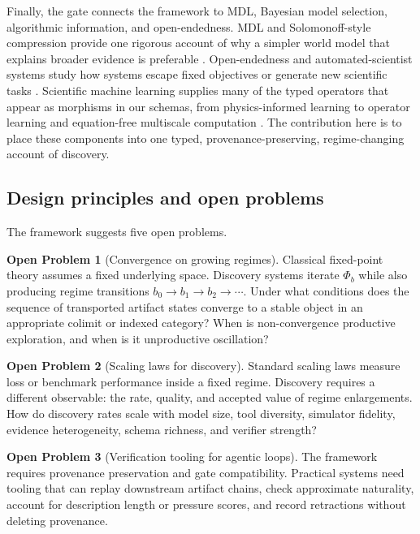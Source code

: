 \documentclass[11pt]{article}
\theoremstyle{definition}
\newtheorem*{openproblem}{Open Problem}
\begin{document}
Finally, the gate connects the framework to MDL, Bayesian model selection, algorithmic information, and open-endedness. MDL and Solomonoff-style compression provide one rigorous account of why a simpler world model that explains broader evidence is preferable \citep{rissanen_mdl_1978,gruenwald_mdl_2007,solomonoff_1964,hutter_aixi_2005,schwarz_bic_1978}. Open-endedness and automated-scientist systems study how systems escape fixed objectives or generate new scientific tasks \citep{stanley_open_endedness_2017,wang_poet_2019,lu_ai_scientist_2024,lu_ai_scientist_v2_2025}. Scientific machine learning supplies many of the typed operators that appear as morphisms in our schemas, from physics-informed learning to operator learning and equation-free multiscale computation \citep{karniadakis_pinns_2021,lu_deeponet_2021,kevrekidis_equation_free_2003}. The contribution here is to place these components into one typed, provenance-preserving, regime-changing account of discovery.

\subsection{Design principles and open problems}
\label{sec:open_results}

The framework suggests five open problems.

\begin{openproblem}[Convergence on growing regimes]
Classical fixed-point theory assumes a fixed underlying space. Discovery systems iterate $\Phi_b$ while also producing regime transitions $b_0\to b_1\to b_2\to\cdots$. Under what conditions does the sequence of transported artifact states converge to a stable object in an appropriate colimit or indexed category? When is non-convergence productive exploration, and when is it unproductive oscillation?
\end{openproblem}

\begin{openproblem}[Scaling laws for discovery]
Standard scaling laws measure loss or benchmark performance inside a fixed regime. Discovery requires a different observable: the rate, quality, and accepted value of regime enlargements. How do discovery rates scale with model size, tool diversity, simulator fidelity, evidence heterogeneity, schema richness, and verifier strength?
\end{openproblem}

\begin{openproblem}[Verification tooling for agentic loops]
The framework requires provenance preservation and gate compatibility. Practical systems need tooling that can replay downstream artifact chains, check approximate naturality, account for description length or pressure scores, and record retractions without deleting provenance.
\end{openproblem}
\end{document}
